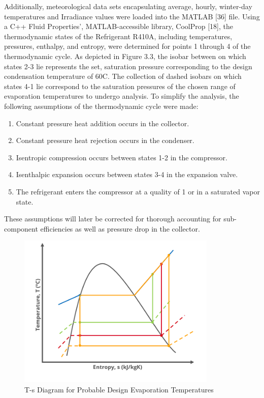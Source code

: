 \medskip
Additionally, meteorological data sets encapsulating average, hourly, winter-day temperatures and Irradiance values were loaded into the MATLAB [36] file. Using a C++ Fluid Properties’, MATLAB-accessible library, CoolProp [18], the thermodynamic states of the Refrigerant R410A, including temperatures, pressures, enthalpy, and entropy, were determined for points 1 through 4 of the thermodynamic cycle. As depicted in Figure 3.3, the isobar between on which states 2-3 lie represents the set, saturation pressure corresponding to the design condensation temperature of 60\textdegree C. The collection of dashed isobars on which states 4-1 lie correspond to the saturation pressures of the chosen range of evaporation temperatures to undergo analysis. To simplify the analysis, the following assumptions of the thermodynamic cycle were made:

\newpage
\begin{enumerate}[itemsep=3mm, parsep=-1mm, label=\roman*.]
    \item Constant pressure heat addition occurs in the collector.
    \item Constant pressure heat rejection occurs in the condenser.
    \item Isentropic compression occurs between states 1-2 in the compressor.
    \item Isenthalpic expansion occurs between states 3-4 in the expansion valve.
    \item The refrigerant enters the compressor at a quality of 1 or in a saturated vapor state.
\end{enumerate}

\medskip
These assumptions will later be corrected for thorough accounting for sub-component efficiencies as well as pressure drop in the collector.

\medskip
\begin{figure}[H]
    \centering
    \includegraphics[width=9.5cm]{images/ts_diagram.png}
    \caption{T-s Diagram for Probable Design Evaporation Temperatures}
\end{figure}

